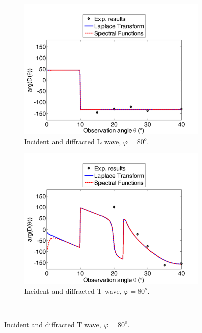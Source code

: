 \begin{figure}[h!]
\centering
    \begin{subfigure}[b]{0.45\textwidth}
        \includegraphics[width=\textwidth]{images/chapter3/Retrodiff_phase_80_L.png}
        \caption{Incident and diffracted L wave, $\varphi=80^o$.}
        \label{C3:DphL80}
    \end{subfigure}
    \hfill  
    \begin{subfigure}[b]{0.45\textwidth}
        \includegraphics[width=\textwidth]{images/chapter3/Retrodiff_phase_80_T.png}
        \caption{Incident and diffracted T wave, $\varphi=80^o$.}
        \label{C3:DphT80}
     \end{subfigure} \\  

\end{figure}
